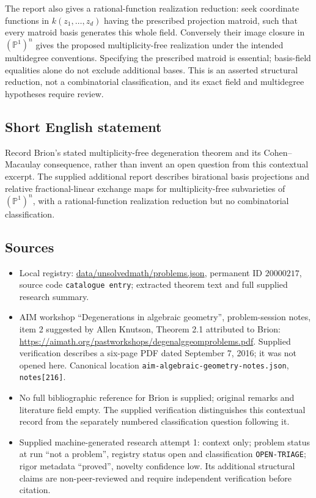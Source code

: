 \documentclass[11pt]{article}
\newcommand{\PP}{\mathbb{P}}
\begin{document}
The report also gives a rational-function realization reduction: seek coordinate functions in $k(z_1,\ldots,z_d)$ having the prescribed projection matroid, such that every matroid basis generates this whole field. Conversely their image closure in $(\PP^1)^n$ gives the proposed multiplicity-free realization under the intended multidegree conventions. Specifying the prescribed matroid is essential; basis-field equalities alone do not exclude additional bases. This is an asserted structural reduction, not a combinatorial classification, and its exact field and multidegree hypotheses require review.
\subsection{Short English statement}
Record Brion's stated multiplicity-free degeneration theorem and its Cohen--Macaulay consequence, rather than invent an open question from this contextual excerpt. The supplied additional report describes birational basis projections and relative fractional-linear exchange maps for multiplicity-free subvarieties of $(\PP^1)^n$, with a rational-function realization reduction but no combinatorial classification.
\subsection{Sources}
\begin{itemize}
\item Local registry: \url{data/unsolvedmath/problems.json}, permanent ID $20000217$, source code \texttt{catalogue entry}; extracted theorem text and full supplied research summary.
\item AIM workshop ``Degenerations in algebraic geometry'', problem-session notes, item 2 suggested by Allen Knutson, Theorem 2.1 attributed to Brion: \url{https://aimath.org/pastworkshops/degenalggeomproblems.pdf}. Supplied verification describes a six-page PDF dated September 7, 2016; it was not opened here. Canonical location \texttt{aim-algebraic-geometry-notes.json}, \texttt{notes[216]}.
\item No full bibliographic reference for Brion is supplied; original remarks and literature field empty. The supplied verification distinguishes this contextual record from the separately numbered classification question following it.
\item Supplied machine-generated research attempt 1: context only; problem status at run ``not a problem'', registry status open and classification \texttt{OPEN-TRIAGE}; rigor metadata ``proved'', novelty confidence low. Its additional structural claims are non-peer-reviewed and require independent verification before citation.
\end{itemize}
\end{document}
